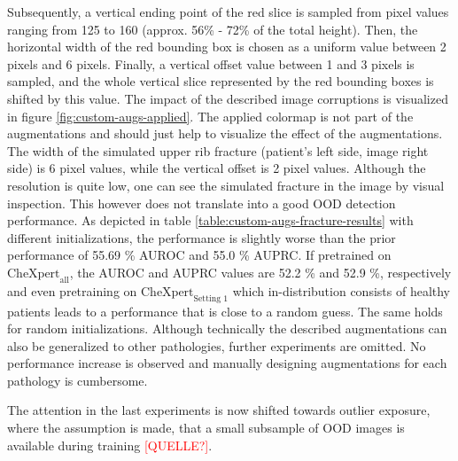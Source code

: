 Subsequently, a vertical ending point of the red slice is sampled from pixel values ranging from 125 to 160 (approx. 56\% - 72\% of the total height).
Then, the horizontal width of the red bounding box is chosen as a uniform value between 2 pixels and 6 pixels.
Finally, a vertical offset value between 1 and 3 pixels is sampled, and the whole vertical slice represented by the red bounding boxes is shifted by this value.
The impact of the described image corruptions is visualized in figure \ref{fig:custom-augs-applied}.
The applied colormap is not part of the augmentations and should just help to visualize the effect of the augmentations.
The width of the simulated upper rib fracture (patient's left side, image right side) is 6 pixel values, while the vertical offset is 2 pixel values.
Although the resolution is quite low, one can see the simulated fracture in the image by visual inspection.
This however does not translate into a good OOD detection performance.
As depicted in table \ref{table:custom-augs-fracture-results} with different initializations, the performance is slightly worse than the prior performance of 55.69 \% AUROC  and 55.0 \% AUPRC.
If pretrained on $\text{CheXpert}_\text{all}$, the AUROC and AUPRC values are 52.2 \% and 52.9 \%, respectively and even pretraining on $\text{CheXpert}_\text{Setting 1}$ which in-distribution consists of healthy patients leads to a performance that is close to a random guess.
The same holds for random initializations.
Although technically the described augmentations can also be generalized to other pathologies, further experiments are omitted.
No performance increase is observed and manually designing augmentations for each pathology is cumbersome.
\par
The attention in the last experiments is now shifted towards outlier exposure, where the assumption is made, that a small subsample of OOD images is available during training \textcolor{red}{[QUELLE?]}.
